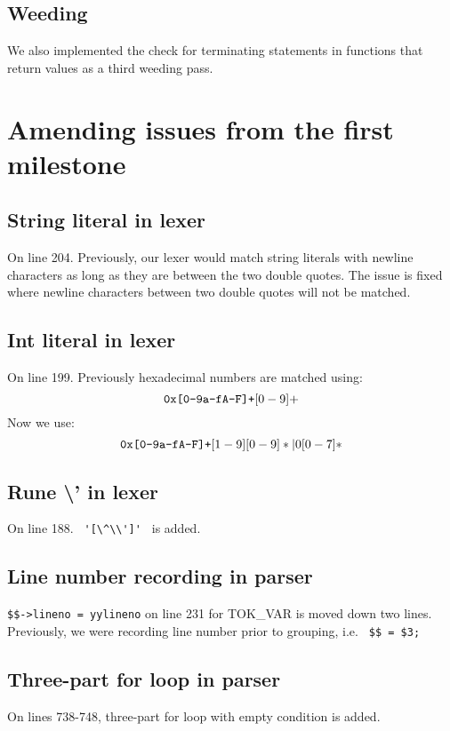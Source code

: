 \documentclass{article}
\begin{document}
\subsection{Weeding}

We also implemented the check for terminating statements in functions that
return values as a third weeding pass.

\section{Amending issues from the first milestone}


\subsection{String literal in lexer}
On line 204. Previously, our lexer would match string literals with newline characters as long as they are between the two double quotes. The issue is fixed where newline characters between two double quotes will not be matched.

\subsection{Int literal in lexer}
On line 199. Previously hexadecimal numbers are matched using:
\[
        \verb|0x[0-9a-fA-F]+|[0-9]+
\]
Now we use:
\[
        \verb|0x[0-9a-fA-F]+|[1-9][0-9]*|0[0-7]*
\]

\subsection{Rune \textbackslash{}' in lexer}
On line 188. \verb| '[\^\\']' | is added.

\subsection{Line number recording in parser}
\verb|$$->lineno = yylineno| on line 231 for TOK\_VAR is moved down two lines. Previously, we were recording line number prior to grouping, i.e. \verb| $$ = $3; |

\subsection{Three-part for loop in parser}
On lines 738-748, three-part for loop with empty condition is added.
\end{document}
